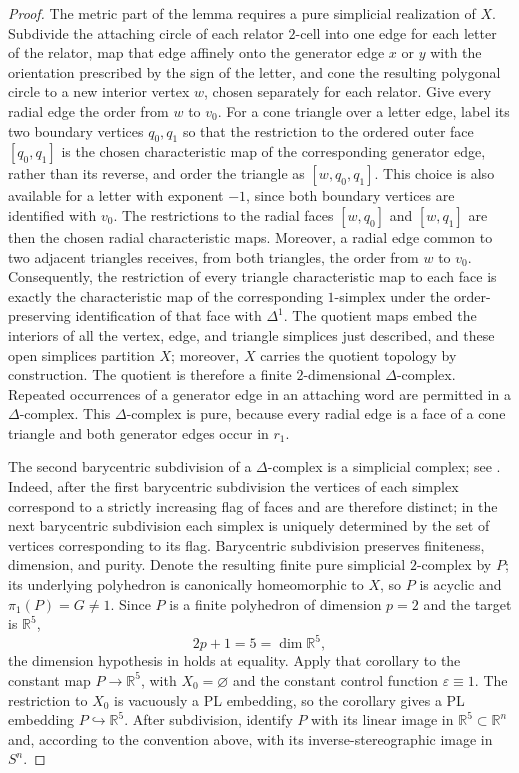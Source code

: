 \documentclass[12pt,oneside,a4paper]{article}
\theoremstyle{mytheorem}
\theoremstyle{remark}
\theoremstyle{definition}
\begin{document}
\begin{proof}
The metric part of the lemma requires a pure simplicial realization of
$X$.  Subdivide the attaching circle of each relator $2$-cell into one
edge for each letter of the relator, map that edge affinely onto the
generator edge $x$ or $y$ with the orientation prescribed by the sign
of the letter, and cone the resulting polygonal circle to a new interior
vertex $w$, chosen separately for each relator.  Give every radial edge
the order from $w$ to $v_0$.  For a cone triangle over
a letter edge, label its two boundary
vertices $q_0,q_1$ so that the restriction to the ordered outer face
$[q_0,q_1]$ is the chosen characteristic map of the corresponding
generator edge, rather than its reverse, and order the triangle as
$[w,q_0,q_1]$.  This choice is also available for a letter with exponent
$-1$, since both boundary vertices are identified with $v_0$.  The
restrictions to the radial faces $[w,q_0]$ and $[w,q_1]$
are then the chosen radial characteristic maps.  Moreover, a radial edge
common to two adjacent triangles receives, from both triangles, the order
from $w$ to $v_0$.  Consequently, the restriction
of every triangle characteristic map to each face is exactly the
characteristic map of the corresponding $1$-simplex under the
order-preserving identification of that face with $\Delta^1$.  The
quotient maps embed the interiors of all the vertex, edge, and triangle
simplices just described, and these open simplices partition $X$; moreover,
$X$ carries the quotient topology by construction.  The quotient is
therefore a finite $2$-dimensional $\Delta$-complex.  Repeated
occurrences of a generator edge in an attaching word are permitted in a
$\Delta$-complex.
This $\Delta$-complex is pure, because every radial edge is a face of a
cone triangle and both generator edges occur in $r_1$.

The second barycentric subdivision of a $\Delta$-complex is a simplicial
complex; see \cite[Exercise~23, p.~133]{zbMATH02103273}.  Indeed, after the
first barycentric subdivision the vertices of each simplex correspond
to a strictly increasing flag of faces and are therefore distinct; in
the next barycentric subdivision each simplex is uniquely determined by
the set of vertices corresponding to its flag.  Barycentric subdivision
preserves finiteness, dimension, and purity.  Denote the resulting finite
pure simplicial $2$-complex by $P$; its underlying polyhedron is
canonically homeomorphic to $X$, so $P$ is acyclic and
$\pi_1(P)=G\neq1$.  Since $P$ is a finite polyhedron of dimension
$p=2$ and the target is $\mathbb R^5$,
\[
2p+1=5=\dim\mathbb R^5,
\]
the dimension hypothesis in
\cite[Corollary~4.4, p.~235]{zbMATH01714503} holds at equality.
Apply that corollary to the constant map $P\to\mathbb R^5$, with
$X_0=\varnothing$ and the constant control function $\varepsilon\equiv1$.
The restriction to $X_0$ is vacuously a PL embedding, so the corollary
gives a PL embedding $P\hookrightarrow\mathbb R^5$.
After subdivision, identify $P$ with its linear image in
$\mathbb R^5\subset\mathbb R^n$ and, according to the convention above,
with its inverse-stereographic image in $S^n$.


\end{proof}
\end{document}
